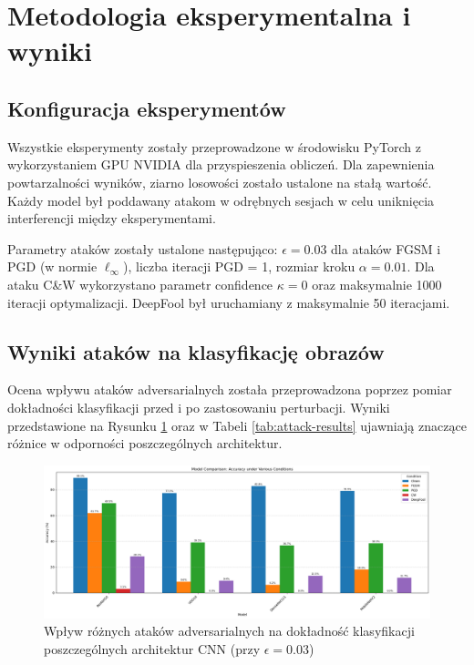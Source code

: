 \documentclass[12pt]{article}
\begin{document}
\section{Metodologia eksperymentalna i wyniki}

\subsection{Konfiguracja eksperymentów}

Wszystkie eksperymenty zostały przeprowadzone w środowisku PyTorch z wykorzystaniem GPU NVIDIA dla przyspieszenia obliczeń. Dla zapewnienia powtarzalności wyników, ziarno losowości zostało ustalone na stałą wartość. Każdy model był poddawany atakom w odrębnych sesjach w celu uniknięcia interferencji między eksperymentami.

Parametry ataków zostały ustalone następująco: $\epsilon = 0.03$ dla ataków FGSM i PGD (w normie $\ell_\infty$), liczba iteracji PGD = 1, rozmiar kroku $\alpha = 0.01$. Dla ataku C\&W wykorzystano parametr confidence $\kappa = 0$ oraz maksymalnie 1000 iteracji optymalizacji. DeepFool był uruchamiany z maksymalnie 50 iteracjami.

\subsection{Wyniki ataków na klasyfikację obrazów}

Ocena wpływu ataków adversarialnych została przeprowadzona poprzez pomiar dokładności klasyfikacji przed i po zastosowaniu perturbacji. Wyniki przedstawione na Rysunku \ref{fig:model-comparison} oraz w Tabeli \ref{tab:attack-results} ujawniają znaczące różnice w odporności poszczególnych architektur.
\begin{figure}[H]
    \centering
    \includegraphics[width=1\textwidth]{model_comparison.png}
    \caption{Wpływ różnych ataków adversarialnych na dokładność klasyfikacji poszczególnych architektur CNN (przy $\epsilon = 0.03$)}
    \label{fig:model-comparison}
\end{figure}
\end{document}
